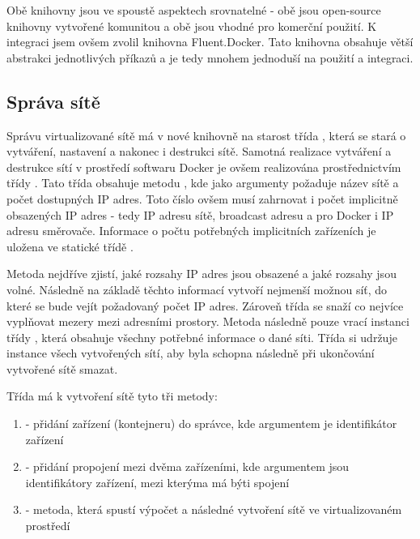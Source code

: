 Obě knihovny jsou ve spoustě aspektech srovnatelné - obě jsou open-source knihovny vytvořené komunitou a obě jsou vhodné pro komerční použití. K integraci jsem ovšem zvolil knihovna Fluent.Docker. Tato knihovna obsahuje větší abstrakci jednotlivých příkazů a je tedy mnohem jednoduší na použití a integraci.

\subsection{Správa sítě}

Správu virtualizované sítě má v nové knihovně na starost třída , která se stará o vytváření, nastavení a nakonec i destrukci sítě. 
Samotná realizace vytváření a destrukce sítí v prostředí softwaru Docker je ovšem realizována prostřednictvím třídy . Tato třída obsahuje metodu , kde jako argumenty požaduje název sítě a počet dostupných IP adres. Toto číslo ovšem musí zahrnovat i počet implicitně obsazených IP adres - tedy IP adresu sítě, broadcast adresu a pro Docker i IP adresu směrovače. Informace o počtu potřebných implicitních zařízeních je uložena ve statické třídě .

Metoda  nejdříve zjistí, jaké rozsahy IP adres jsou obsazené a jaké rozsahy jsou volné. Následně na základě těchto informací vytvoří nejmenší možnou síť, do které se bude vejít požadovaný počet IP adres. Zároveň třída se snaží  co nejvíce vyplňovat mezery mezi adresními prostory. Metoda následně pouze vrací instanci třídy , která obsahuje všechny potřebné informace o dané síti. Třída  si udržuje instance všech vytvořených sítí, aby byla schopna následně při ukončování vytvořené sítě smazat. 

Třída  má k vytvoření sítě tyto tři metody:

\begin{enumerate}
    \item {} - přidání zařízení (kontejneru) do správce, kde argumentem je identifikátor zařízení
    \item {} - přidání propojení mezi dvěma zařízeními, kde argumentem jsou identifikátory zařízení, mezi kterýma má býti spojení
    \item {} - metoda, která spustí výpočet a následné vytvoření sítě ve virtualizovaném prostředí
\end{enumerate}

